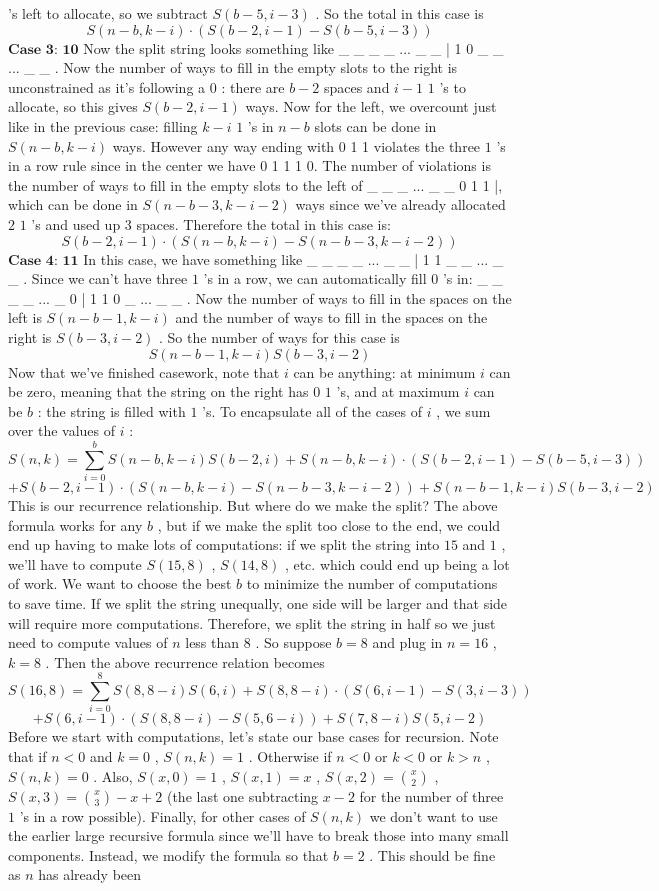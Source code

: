 \documentclass[12pt]{article}
\begin{document}
's left to allocate, so we subtract $S(b-5, i-3)$ . So the total in this case is \[S(n-b,k-i) \cdot (S(b-2, i-1)-S(b-5, i-3))\] $\textbf{Case 3: 10}$ Now the split string looks something like _ _ _ _ ... _ _ | 1 0 _ _ ... _ _ . Now the number of ways to fill in the empty slots to the right is unconstrained as it's following a $0$ : there are $b-2$ spaces and $i-1$ $1$ 's to allocate, so this gives $S(b-2, i-1)$ ways. Now for the left, we overcount just like in the previous case: filling $k-i$ $1$ 's in $n-b$ slots can be done in $S(n-b, k-i)$ ways. However any way ending with 0 1 1 violates the three $1$ 's in a row rule since in the center we have 0 1 1 1 0. The number of violations is the number of ways to fill in the empty slots to the left of _ _ _ ... _ _ 0 1 1 |, which can be done in $S(n-b-3, k-i-2)$ ways since we've already allocated $2$ $1$ 's and used up $3$ spaces. Therefore the total in this case is: \[S(b-2, i-1) \cdot (S(n-b, k-i)-S(n-b-3, k-i-2))\] $\textbf{Case 4: 11}$ In this case, we have something like _ _ _ _ ... _ _ | 1 1 _ _ ... _ _ . Since we can't have three $1$ 's in a row, we can automatically fill $0$ 's in: _ _ _ _ ... _ 0 | 1 1 0 _ ... _ _ . Now the number of ways to fill in the spaces on the left is $S(n-b-1, k-i)$ and the number of ways to fill in the spaces on the right is $S(b-3, i-2)$ . So the number of ways for this case is \[S(n-b-1,k-i)S(b-3,i-2)\] Now that we've finished casework, note that $i$ can be anything: at minimum $i$ can be zero, meaning that the string on the right has $0$ $1$ 's, and at maximum $i$ can be $b$ : the string is filled with $1$ 's. To encapsulate all of the cases of $i$ , we sum over the values of $i$ : \[S(n,k) = \sum_{i = 0}^{b} S(n-b, k-i)S(b-2, i) + S(n-b,k-i) \cdot (S(b-2, i-1)-S(b-5, i-3))\] \[+ S(b-2, i-1) \cdot (S(n-b, k-i)-S(n-b-3, k-i-2)) + S(n-b-1,k-i)S(b-3,i-2)\] This is our recurrence relationship. But where do we make the split? The above formula works for any $b$ , but if we make the split too close to the end, we could end up having to make lots of computations: if we split the string into $15$ and $1$ , we'll have to compute $S(15,8)$ , $S(14,8)$ , etc. which could end up being a lot of work. We want to choose the best $b$ to minimize the number of computations to save time. If we split the string unequally, one side will be larger and that side will require more computations. Therefore, we split the string in half so we just need to compute values of $n$ less than $8$ . So suppose $b = 8$ and plug in $n=16$ , $k=8$ . Then the above recurrence relation becomes \[S(16,8) = \sum_{i = 0}^{8} S(8, 8-i)S(6, i) + S(8,8-i) \cdot (S(6, i-1)-S(3, i-3))\] \[+ S(6, i-1) \cdot (S(8, 8-i)-S(5, 6-i)) + S(7,8-i)S(5,i-2)\] Before we start with computations, let's state our base cases for recursion. Note that if $n<0$ and $k = 0$ , $S(n,k) = 1$ . Otherwise if $n<0$ or $k<0$ or $k>n$ , $S(n,k) = 0$ . Also, $S(x,0) = 1$ , $S(x,1) = x$ , $S(x,2) = \binom{x}{2}$ , $S(x,3) = \binom{x}{3}-x+2$ (the last one subtracting $x-2$ for the number of three $1$ 's in a row possible). Finally, for other cases of $S(n,k)$ we don't want to use the earlier large recursive formula since we'll have to break those into many small components. Instead, we modify the formula so that $b=2$ . This should be fine as $n$ has already been 
\end{document}
